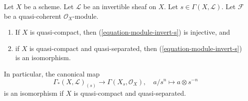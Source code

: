 \begin{lemma}
\label{lemma-invert-s-sections}
\begin{reference}
\cite[Section 6.8]{EGA1-second}
\end{reference}
Let $X$ be a scheme. Let $\mathcal{L}$ be an invertible sheaf on $X$.
Let $s \in \Gamma(X, \mathcal{L})$. Let $\mathcal{F}$ be a quasi-coherent
$\mathcal{O}_X$-module.
\begin{enumerate}
\item If $X$ is quasi-compact, then (\ref{equation-module-invert-s})
is injective, and
\item if $X$ is quasi-compact and quasi-separated, then
(\ref{equation-module-invert-s}) is an isomorphism.
\end{enumerate}
In particular, the canonical map
$$
\Gamma_*(X, \mathcal{L})_{(s)}
\longrightarrow
\Gamma(X_s, \mathcal{O}_X),\quad
a/s^n \longmapsto a \otimes s^{-n}
$$
is an isomorphism if $X$ is quasi-compact and quasi-separated.
\end{lemma}

